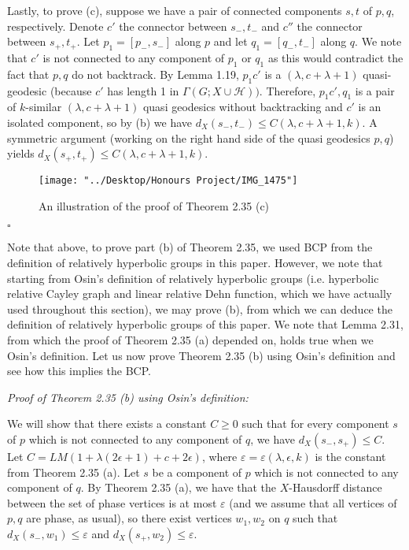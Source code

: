 \documentclass[12pt]{article}
\newcommand{\vs}{\vskip10pt}
\begin{document}
	\vs 
	
	Lastly, to prove (c), suppose we have a pair of connected components $s,t$ of $p,q$, respectively. Denote $c'$ the connector between $s_-, t_-$ and $c''$ the connector between $s_+, t_+$. Let $p_1 = [p_-, s_-]$ along $p$ and let $q_1 = [q_-, t_-]$ along $q$. We note that $c'$ is not connected to any component of $p_1$ or $q_1$ as this would contradict the fact that $p,q$ do not backtrack. By Lemma 1.19, $p_1 c'$ is a $(\lambda, c + \lambda + 1)$ quasi-geodesic (because $c'$ has length 1 in $\Gamma(G; X \cup \mathcal{H}))$. Therefore, $p_1 c', q_1$ is a pair of $k$-similar $(\lambda, c + \lambda + 1)$ quasi geodesics without backtracking and $c'$ is an isolated component, so by (b) we have $d_X(s_-, t_-) \leq C(\lambda, c + \lambda + 1, k)$. A symmetric argument (working on the right hand side of the quasi geodesics $p,q$) yields $d_X(s_+, t_+) \leq C(\lambda, c + \lambda + 1, k)$.
	
\begin{figure} [H]
	\centering
	\texttt{[image: "../Desktop/Honours Project/IMG\_1475"]}
	\caption{An illustration of the proof of Theorem 2.35 (c)}
	\label{fig:img1475}
\end{figure}
	
	$\square$
	
	Note that above, to prove part (b) of Theorem 2.35, we used BCP from the definition of relatively hyperbolic groups in this paper. However, we note that starting from Osin's definition of relatively hyperbolic groups (i.e. hyperbolic relative Cayley graph and linear relative Dehn function, which we have actually used throughout this section), we may prove (b), from which we can deduce the definition of relatively hyperbolic groups of this paper. We note that Lemma 2.31, from which the proof of Theorem 2.35 (a) depended on, holds true when we Osin's definition. Let us now prove Theorem 2.35 (b) using Osin's definition and see how this implies the BCP. 
	
	\vs 
	
	\textit{Proof of Theorem 2.35 (b) using Osin's definition: } 
	
	\vs 
	
	We will show that there exists a constant $C \geq 0$ such that for every component $s$ of $p$ which is not connected to any component of $q$, we have $d_X(s_-, s_+) \leq C$. Let $C = LM(1 + \lambda(2 \epsilon + 1) + c + 2 \epsilon)$, where $\varepsilon = \varepsilon(\lambda, \epsilon, k)$ is the constant from Theorem 2.35 (a). Let $s$ be a component of $p$ which is not connected to any component of $q$. By Theorem 2.35 (a), we have that the $X$-Hausdorff distance between the set of phase vertices is at most $\varepsilon$ (and we assume that all vertices of $p,q$ are phase, as usual), so there exist vertices $w_1, w_2$ on $q$ such that $d_X(s_-, w_1) \leq \varepsilon$ and $d_X(s_+, w_2) \leq \varepsilon$. 
	
\end{document}
